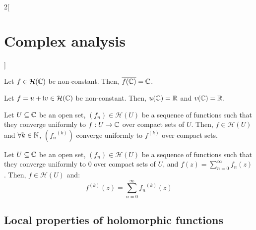 \documentclass[../../../main.tex]{subfiles}
\begin{document}
\begin{multicols}{2}[\section{Complex analysis}]
  \begin{theorem}
    Let $f\in\mathcal{H}(\mathbb{C})$ be non-constant. Then, $\overline{f(\mathbb{C})}=\mathbb{C}$.
  \end{theorem}
  \begin{corollary}
    Let $f=u+\mathrm{i} v\in\mathcal{H}(\mathbb{C})$ be non-constant. Then, $u(\mathbb{C})=\mathbb{R}$ and $v(\mathbb{C})=\mathbb{R}$.
  \end{corollary}
  \begin{theorem}
    Let $U\subseteq\mathbb{C}$ be an open set, $(f_n)\in\mathcal{H}(U)$ be a sequence of functions such that they converge uniformly to $f:U\rightarrow\mathbb{C}$ over compact sets of $U$. Then, $f\in\mathcal{H}(U)$ and $\forall k\in \mathbb{N}$, $({f_n}^{(k)})$ converge uniformly to $f^{(k)}$ over compact sets.
  \end{theorem}
  \begin{corollary}
    Let $U\subseteq\mathbb{C}$ be an open set, $(f_n)\in\mathcal{H}(U)$ be a sequence of functions such that they converge uniformly to 0 over compact sets of $U$, and $f(z)=\sum_{n=0}^\infty f_n(z)$. Then, $f\in\mathcal{H}(U)$ and: $$f^{(k)}(z)=\sum_{n=0}^\infty {f_n}^{(k)}(z)$$
  \end{corollary}
  \subsection{Local properties of holomorphic functions}

\end{multicols}
\end{document}
